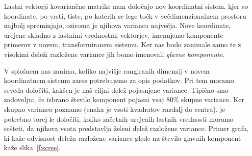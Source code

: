 Lastni vektorji kovariančne matrike nam določajo nov koordinatni
sistem, kjer so koordinate, po vrsti, tiste, po katerih se lege točk v
večdimenzionalnem prostoru najbolj spreminjajo, oziroma je njihova
varianca največja. Nove koordinate, urejene skladno z lastnimi vrednostmi vektorjev, imenujemo komponente primerov v novem, transformiranem sistemu. Ker nas bodo zanimale samo te z visokimi deleži razložene variance jih bomo imenovali {\em glavne komponente}.

\begin{figure}[htbp]
\end{figure}

V splošnem nas zanima, koliko najvišje rangiranih dimenzij v novem
koordinatnem sistemu zares potrebujemo za opis podatkov. Pri tem moramo
seveda določiti, kakšen je naš ciljni delež pojasnjene variance. Tipično
smo zadovoljni, če izbrano število komponent pojasni vsaj $80\%$ skupne variance. Ker skupno varianco poznamo (enaka je vsoti kvadratov razdalj do
centra), je potrebno torej le določiti, koliko začetnih urejenih lastnih
vrednosti moramo sešteti, da njihova vsota predstavlja želeni delež razložene variance. Primer grafa, ki kaže odvisnost deleža razložene variance glede na število glavnih komponent kaže slika~\ref{f:scree}.

